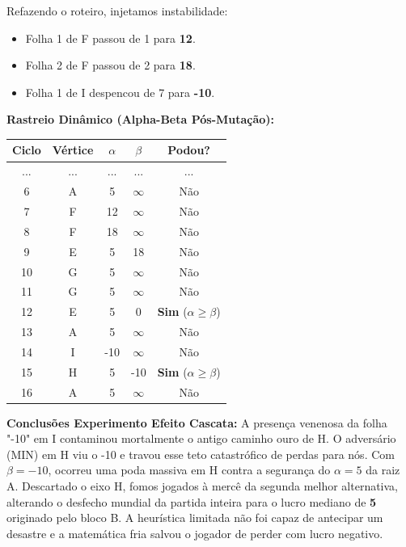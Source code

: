 Refazendo o roteiro, injetamos instabilidade:
\begin{itemize}
    \item Folha 1 de F passou de 1 para \textbf{12}.
    \item Folha 2 de F passou de 2 para \textbf{18}.
    \item Folha 1 de I despencou de 7 para \textbf{-10}.
\end{itemize}

\textbf{Rastreio Dinâmico (Alpha-Beta Pós-Mutação):}

\begin{table}[H]
\centering
\begin{tabular}{|c|c|c|c|c|}
\hline
\textbf{Ciclo} & \textbf{Vértice} & \textbf{$\alpha$} & \textbf{$\beta$} & \textbf{Podou?} \\ \hline
... & ... & ... & ... & ... \\ \hline
6 & A & 5 & $\infty$ & Não \\ \hline
7 & F & 12 & $\infty$ & Não \\ \hline
8 & F & 18 & $\infty$ & Não \\ \hline
9 & E & 5 & 18 & Não \\ \hline
10 & G & 5 & $\infty$ & Não \\ \hline
11 & G & 5 & $\infty$ & Não \\ \hline
12 & E & 5 & 0 & \textbf{Sim} ($\alpha \ge \beta$) \\ \hline
13 & A & 5 & $\infty$ & Não \\ \hline
14 & I & -10 & $\infty$ & Não \\ \hline
15 & H & 5 & -10 & \textbf{Sim} ($\alpha \ge \beta$) \\ \hline
16 & A & 5 & $\infty$ & Não \\ \hline
\end{tabular}
\end{table}

\textbf{Conclusões Experimento Efeito Cascata:}
A presença venenosa da folha "-10" em I contaminou mortalmente o antigo caminho ouro de H. O adversário (MIN) em H viu o -10 e travou esse teto catastrófico de perdas para nós. Com $\beta = -10$, ocorreu uma poda massiva em H contra a segurança do $\alpha = 5$ da raiz A. Descartado o eixo H, fomos jogados à mercê da segunda melhor alternativa, alterando o desfecho mundial da partida inteira para o lucro mediano de \textbf{5} originado pelo bloco B. A heurística limitada não foi capaz de antecipar um desastre e a matemática fria salvou o jogador de perder com lucro negativo.
